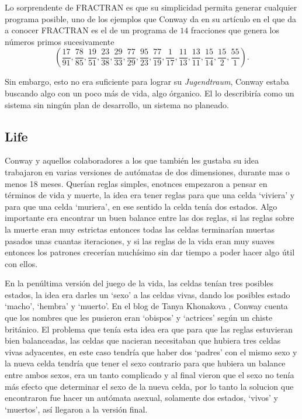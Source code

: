 Lo sorprendente de FRACTRAN es que su simplicidad permita generar cualquier programa posible, uno de los ejemplos que Conway da en su art\'iculo \cite{Conway1987} en el que da a conocer FRACTRAN es el de un programa de $14$ fracciones que genera los n\'umeros primos sucesivamente 
\[
    {\displaystyle \left({\frac {17}{91}},{\frac {78}{85}},{\frac {19}{51}},{\frac {23}{38}},{\frac {29}{33}},{\frac {77}{29}},{\frac {95}{23}},{\frac {77}{19}},{\frac {1}{17}},{\frac {11}{13}},{\frac {13}{11}},{\frac {15}{14}},{\frac {15}{2}},{\frac {55}{1}}\right)}.
\]

Sin embargo, esto no era suficiente para lograr su \textit{Jugendtraum}, Conway estaba buscando algo con un poco m\'as de vida, algo \'organico. El lo describir\'ia como un sistema sin ning\'un plan de desarrollo, un sistema no planeado.

\subsection{Life}

\label{subsection:life-explain}

Conway y aquellos colaboradores a los que tambi\'en les gustaba su idea trabajaron en varias versiones de aut\'omatas de dos dimensiones, durante mas o menos 18 meses. Quer\'ian reglas simples, enotnces empezaron a pensar en t\'erminos de vida y muerte, la idea era tener reglas para que una celda `viviera' y para que una celda `muriera', en ese sentido la celda ten\'ia dos estados. Algo importante era encontrar un buen balance entre las dos reglas, si las reglas sobre la muerte eran muy estrictas entonces todas las celdas terminar\'ian muertas pasados unas cuantas iteraciones, y si las reglas de la vida eran muy suaves entonces los patrones crecer\'ian much\'isimo sin dar tiempo a poder hacer algo \'util con ellos.

En la pen\'ultima versi\'on del juego de la vida, las celdas ten\'ian tres posibles estados, la idea era darles un `sexo' a las celdas vivas, dando los posibles estado `macho', `hembra' y `muerto'. En el blog de Tanya Khonakova \cite{blog:tanyakhovanova}, Conway cuenta que los nombres que les pusieron eran `obispos' y `actrices' seg\'un un chiste brit\'anico. El problema que ten\'ia esta idea era que para que las reglas estuvieran bien balanceadas, las celdas que nacieran necesitaban que hubiera tres celdas vivas adyacentes, en este caso tendr\'ia que haber dos `padres' con el mismo sexo y la nueva celda tendr\'ia que tener el sexo contrario para que hubiera un balance entre ambos sexos, era un tanto complicado y al final vieron que el sexo no ten\'ia m\'as efecto que determinar el sexo de la nueva celda, por lo tanto la solucion que encontraron fue hacer un aut\'omata asexual, solamente dos estados, `vivos' y `muertos', as\'i llegaron a la versi\'on final.

